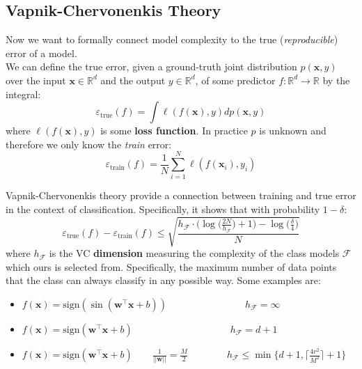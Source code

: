 \subsection{Vapnik-Chervonenkis Theory}
Now we want to formally connect model complexity to the true (\textit{reproducible}) error of a model.\\

We can define the true error, given a ground-truth joint distribution $p(\mathbf{x},y)$ over the input $\mathbf{x} \in \mathbb{R}^d$ and the output $y \in \mathbb{R}^d$, of some predictor $f: \mathbb{R}^d \to \mathbb{R}$ by the integral:
\begin{equation}
	\varepsilon_\text{true}(f) = \int \ell(f(\mathbf{x}),y)dp(\mathbf{x},y)
\end{equation}
where $\ell(f(\mathbf{x}),y)$ is some \textbf{loss function}. In practice $p$ is unknown and therefore we only know the \textit{train} error:
\begin{equation}
	\varepsilon_\text{train}(f) = \frac{1}{N} \sum_{i=1}^{N}\ell(f(\mathbf{x}_i), y_i)
\end{equation}

Vapnik-Chervonenkis theory provide a connection between training and true error in the context of classification. Specifically, it shows that with probability $1 - \delta$:
\begin{equation}
	\varepsilon_\text{true}(f) - \varepsilon_\text{train}(f) \leq \sqrt{\frac{h_\mathcal{F} \cdot \bigg(\log\bigg(\frac{2N}{h_\mathcal{F}}\bigg)+1\bigg)-\log\bigg(\frac{\delta}{4}\bigg)}{N}}
\end{equation}
where $h_\mathcal{F}$ is the VC \textbf{dimension} measuring the complexity of the class models $\mathcal{F}$ which ours is selected from. Specifically, the maximum number of data points that the class can always classify in any possible way. Some examples are:
\begin{itemize}
	\item $
		f(\mathbf{x}) = \text{sign}(\sin(\mathbf{w}^\top \mathbf{x}+b)) \qquad\qquad\qquad\qquad h_\mathcal{F} = \infty
$
	\item $
		f(\mathbf{x}) = \text{sign}(\mathbf{w}^\top \mathbf{x}+b) \qquad\qquad\qquad\qquad\qquad h_\mathcal{F} = d+1
$
	\item $
		f(\mathbf{x}) = \text{sign}(\mathbf{w}^\top \mathbf{x}+b)\qquad \frac{1}{\lvert\lvert \mathbf{w} \rvert\rvert} = \frac{M}{2} \qquad\qquad h_\mathcal{F} \leq \min\{d+1, \lceil \frac{4r^2}{M^2} \rceil +1\}
$
\end{itemize}